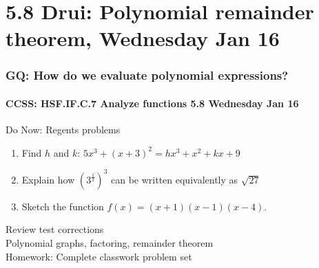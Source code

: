 \documentclass{beamer}
\begin{document}
  \section{5.8 Drui: Polynomial remainder theorem, Wednesday Jan 16}
    \frame
    {
      \frametitle{GQ: How do we evaluate polynomial expressions?}
      \framesubtitle{CCSS: HSF.IF.C.7 Analyze functions    \alert{5.8 Wednesday Jan 16}}

      \begin{block}{Do Now: Regents problems}
        \begin{enumerate}
          \item Find $h$ and $k$: $5x^3+(x+3)^2=hx^3+x^2+kx+9$
          \item Explain how $\displaystyle (3^{\frac{1}{2}})^3$ can be written equivalently as $\sqrt{27}$
          \item Sketch the function $f(x)=(x+1)(x-1)(x-4)$.
        \end{enumerate}
      \end{block}
      Review test corrections\\
      Polynomial graphs, factoring, remainder theorem \\ \bigskip
      Homework: Complete classwork problem set
    }
\end{document}
